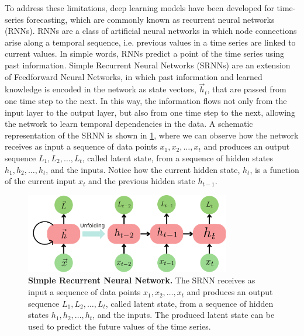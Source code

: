 
To address these limitations, deep learning models have been developed for
time-series forecasting, which are commonly known as recurrent neural networks
(RNNs). RNNs are a class of artificial neural networks in which node
connections arise along a temporal sequence, i.e. previous values in a time
series are linked to current values. In simple words, RNNs predict a
point of the time series using past information. Simple Recurrent Neural
Networks (SRNNs) are an extension of Feedforward Neural Networks, in which past
information and learned knowledge is encoded in the network as state vectors,
$\vec{h}_t$, that are passed from one time step to the next. In this way, the
information flows not only from the input layer to the output layer, but also
from one time step to the next, allowing the network to learn temporal
dependencies in the data. A schematic representation of the SRNN is shown in
\cref{fig:SRNN_scheme}, where we can observe how the network receives as input
a sequence of data points $x_1, x_2, \ldots, x_t$ and produces an output
sequence $L_1, L_2, \ldots, L_t$, called latent state, from a sequence of
hidden states $h_1, h_2, \ldots, h_t$, and the inputs. Notice how the current
hidden state, $h_t$, is a function of the current input $x_{t}$ and the
previous hidden state $h_{t-1}$.

\begin{figure}[H]
  \centering
  \includegraphics[width=0.8\textwidth]{Figures/RNN.pdf}
  \caption[Simple Recurrent Neural Network]{
    \textbf{Simple Recurrent Neural Network.} The SRNN receives as input a
    sequence of data points $x_1, x_2, \ldots, x_t$ and produces an output
    sequence $L_1, L_2, \ldots, L_t$, called latent state, from a sequence of
    hidden states $h_1, h_2, \ldots, h_t$, and the inputs. The produced latent
    state can be used to predict the future values of the time series.}
  \label{fig:SRNN_scheme}
\end{figure}

